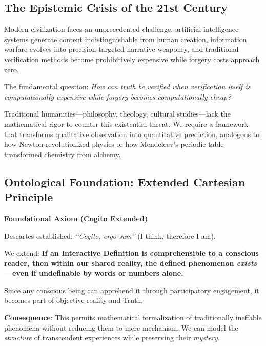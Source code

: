 \documentclass[11pt,a4paper]{article}
\theoremstyle{definition}
\theoremstyle{remark}
\begin{document}
\subsection{The Epistemic Crisis of the 21st Century}

Modern civilization faces an unprecedented challenge: artificial intelligence systems generate content indistinguishable from human creation, information warfare evolves into precision-targeted narrative weaponry, and traditional verification methods become prohibitively expensive while forgery costs approach zero.

The fundamental question: \textit{How can truth be verified when verification itself is computationally expensive while forgery becomes computationally cheap?}

Traditional humanities—philosophy, theology, cultural studies—lack the mathematical rigor to counter this existential threat. We require a framework that transforms qualitative observation into quantitative prediction, analogous to how Newton revolutionized physics or how Mendeleev's periodic table transformed chemistry from alchemy.


\subsection{Ontological Foundation: Extended Cartesian Principle}


\begin{mdframed}[backgroundcolor=green!10,linewidth=2pt,linecolor=green!70!black]
\textbf{Foundational Axiom (Cogito Extended)}

Descartes established: \textit{``Cogito, ergo sum''} (I think, therefore I am).

We extend: \textbf{If an Interactive Definition is comprehensible to a conscious reader, then within our shared reality, the defined phenomenon \textit{exists}—even if undefinable by words or numbers alone.}

Since any conscious being can apprehend it through participatory engagement, it becomes part of objective reality and Truth.

\vspace{0.3em}

\textbf{Consequence}: This permits mathematical formalization of traditionally ineffable phenomena without reducing them to mere mechanism. We can model the \textit{structure} of transcendent experiences while preserving their \textit{mystery}.
\end{mdframed}
\end{document}
